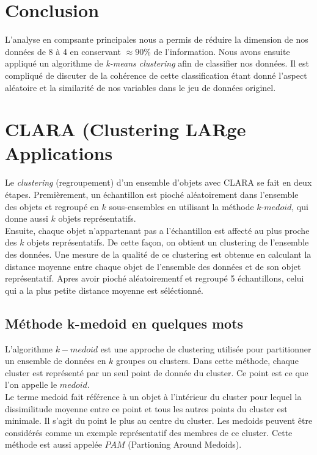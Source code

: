 \documentclass[11pt]{article}
\begin{document}
\section{Conclusion}
L'analyse en compsante principales nous a permis de réduire la dimension de nos données de 8 à 4 en conservant $\approx 90\% $ de l'information. Nous avons ensuite appliqué un algorithme de \emph{k-means clustering} afin de classifier nos données. Il est compliqué de discuter de la cohérence de cette classification étant donné l'aspect aléatoire et la similarité de nos variables dans le jeu de données originel. 
\newpage
\section{CLARA (Clustering LARge Applications}
Le \emph{clustering} (regroupement) d'un ensemble d'objets avec CLARA se fait en deux étapes. Premièrement, un échantillon est pioché aléatoirement dans l'ensemble des objets et regroupé en $k$ sous-ensembles en utilisant la méthode $k$-$medoid$, qui donne aussi $k$ objets représentatifs.\\
Ensuite, chaque objet n'appartenant pas a l'échantillon est affecté au plus proche des $k$ objets représentatifs. De cette façon, on obtient un clustering de l'ensemble des données. Une mesure de la qualité de ce clustering est obtenue en calculant la distance moyenne entre chaque objet de l'ensemble des données et de son objet représentatif. Apres avoir pioché aléatoirementf et regroupé 5 échantillons, celui qui a la plus petite distance moyenne est séléctionné.

\subsection{Méthode k-medoid en quelques mots}
L'algorithme $k-medoid$ est une approche de clustering utilisée pour partitionner un ensemble de données en $k$ groupes ou clusters. Dans cette méthode, chaque cluster est représenté par un seul point de donnée du cluster. Ce point est ce que l'on appelle le $medoid$.\\
Le terme medoid fait référence à un objet à l'intérieur du cluster pour lequel la dissimilitude moyenne entre ce point et tous les autres points du cluster est minimale. Il s'agit du point le plus au centre du cluster. Les medoids peuvent être considérés comme un exemple représentatif des membres de ce cluster.
Cette méthode est aussi appelée $PAM$ (Partioning Around Medoids).\\
\end{document}
